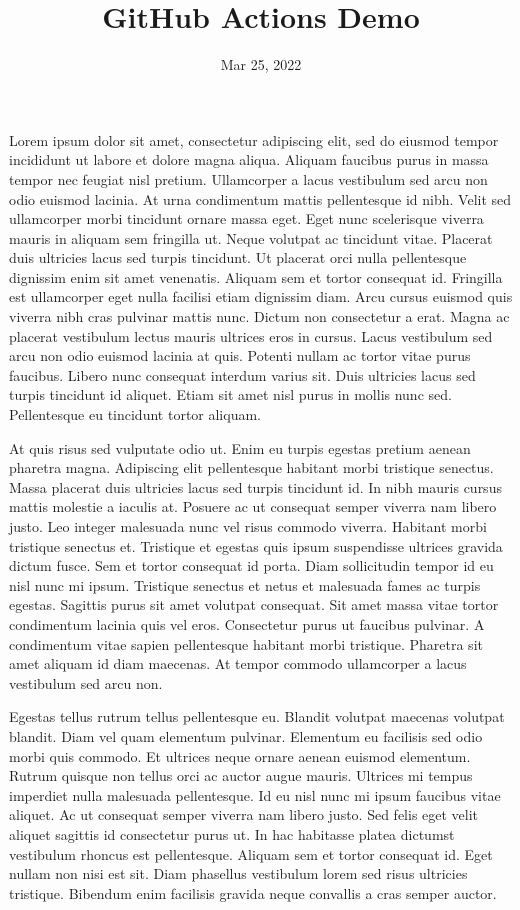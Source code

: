 \documentclass{article}
\title{GitHub Actions Demo}
\author{}
\date{Mar 25, 2022}
\begin{document}
\maketitle

Lorem ipsum dolor sit amet, consectetur adipiscing elit, sed do eiusmod tempor incididunt ut labore et dolore magna aliqua. Aliquam faucibus purus in massa tempor nec feugiat nisl pretium. Ullamcorper a lacus vestibulum sed arcu non odio euismod lacinia. At urna condimentum mattis pellentesque id nibh. Velit sed ullamcorper morbi tincidunt ornare massa eget. Eget nunc scelerisque viverra mauris in aliquam sem fringilla ut. Neque volutpat ac tincidunt vitae. Placerat duis ultricies lacus sed turpis tincidunt. Ut placerat orci nulla pellentesque dignissim enim sit amet venenatis. Aliquam sem et tortor consequat id. Fringilla est ullamcorper eget nulla facilisi etiam dignissim diam. Arcu cursus euismod quis viverra nibh cras pulvinar mattis nunc. Dictum non consectetur a erat. Magna ac placerat vestibulum lectus mauris ultrices eros in cursus. Lacus vestibulum sed arcu non odio euismod lacinia at quis. Potenti nullam ac tortor vitae purus faucibus. Libero nunc consequat interdum varius sit. Duis ultricies lacus sed turpis tincidunt id aliquet. Etiam sit amet nisl purus in mollis nunc sed. Pellentesque eu tincidunt tortor aliquam.


At quis risus sed vulputate odio ut. Enim eu turpis egestas pretium aenean pharetra magna. Adipiscing elit pellentesque habitant morbi tristique senectus. Massa placerat duis ultricies lacus sed turpis tincidunt id. In nibh mauris cursus mattis molestie a iaculis at. Posuere ac ut consequat semper viverra nam libero justo. Leo integer malesuada nunc vel risus commodo viverra. Habitant morbi tristique senectus et. Tristique et egestas quis ipsum suspendisse ultrices gravida dictum fusce. Sem et tortor consequat id porta. Diam sollicitudin tempor id eu nisl nunc mi ipsum. Tristique senectus et netus et malesuada fames ac turpis egestas. Sagittis purus sit amet volutpat consequat. Sit amet massa vitae tortor condimentum lacinia quis vel eros. Consectetur purus ut faucibus pulvinar. A condimentum vitae sapien pellentesque habitant morbi tristique. Pharetra sit amet aliquam id diam maecenas. At tempor commodo ullamcorper a lacus vestibulum sed arcu non.

Egestas tellus rutrum tellus pellentesque eu. Blandit volutpat maecenas volutpat blandit. Diam vel quam elementum pulvinar. Elementum eu facilisis sed odio morbi quis commodo. Et ultrices neque ornare aenean euismod elementum. Rutrum quisque non tellus orci ac auctor augue mauris. Ultrices mi tempus imperdiet nulla malesuada pellentesque. Id eu nisl nunc mi ipsum faucibus vitae aliquet. Ac ut consequat semper viverra nam libero justo. Sed felis eget velit aliquet sagittis id consectetur purus ut. In hac habitasse platea dictumst vestibulum rhoncus est pellentesque. Aliquam sem et tortor consequat id. Eget nullam non nisi est sit. Diam phasellus vestibulum lorem sed risus ultricies tristique. Bibendum enim facilisis gravida neque convallis a cras semper auctor.
\end{document}
